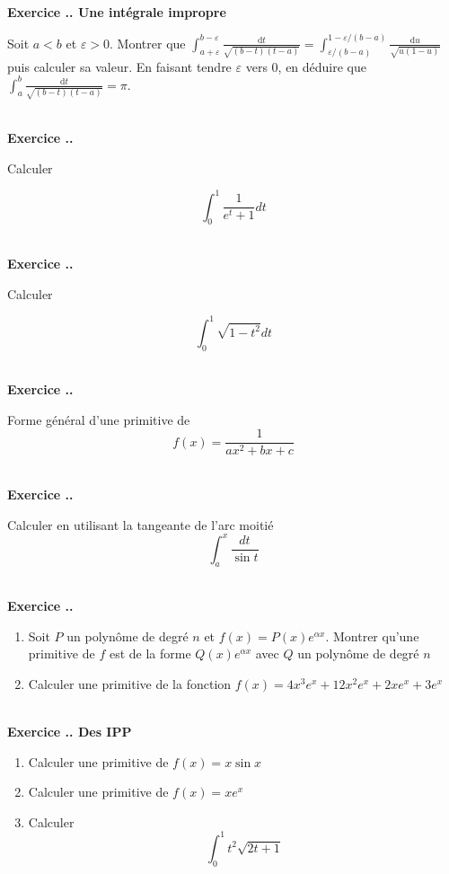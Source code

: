 \documentclass{article}
\newcommand{\di}{\mathrm{d}}
\newcounter{exo}
\newcommand{\exercice}[1][\null]{\textbf{\\ Exercice \thesection.\theexo. #1} \addtocounter{exo}{1}}
\begin{document}
\exercice[Une intégrale impropre]

Soit $a<b$ et $\varepsilon > 0$. Montrer que $\displaystyle \int_{a+ \varepsilon}^{b - \varepsilon} \frac{\di t}{\sqrt{(b-t)(t-a)}} = \int_{\varepsilon/(b-a)}^{1-\varepsilon/(b-a)} \frac{\di u}{\sqrt{u(1-u)}}$ puis calculer sa valeur. En faisant tendre $\varepsilon$ vers 0, en déduire que $\displaystyle \int_{a}^{b} \frac{\di t}{\sqrt{(b-t)(t-a)}}  = \pi$.

\exercice 

Calculer 

\begin{equation*}
    \int_0^1 \frac{1}{e^t + 1} dt 
\end{equation*}

\exercice 

Calculer 

\begin{equation*}
    \int_0^1 \sqrt{1 - t^2} dt 
\end{equation*}

\exercice 

Forme général d'une primitive de 
\begin{equation*}
    f(x) = \frac{1}{ax^2 + bx + c}
\end{equation*}

\exercice 

Calculer en utilisant la tangeante de l'arc moitié
\begin{equation*}
    \int_a^x \frac{dt}{\sin t}
\end{equation*}


\exercice

\begin{enumerate}
    \item Soit $P$ un polynôme de degré $n$ et 
        $f(x) = P(x) e^{\alpha x}$. Montrer qu'une 
        primitive de $f$ est de la forme $Q(x) e^{\alpha x}$
        avec $Q$ un polynôme de degré $n$

    \item Calculer une primitive de 
        la fonction $f(x) = 4x^3 e^x + 12x^2 e^x + 2x e^x + 3e^x$
\end{enumerate}

\exercice[Des IPP]

\begin{enumerate}
    \item Calculer une primitive de $f(x) = x \sin x$
    \item Calculer une primitive de $f(x) = x e^x$
    \item Calculer 
        \begin{equation*}
            \int_0^1 t^2 \sqrt{2t + 1}
        \end{equation*}
\end{enumerate}
\end{document}
